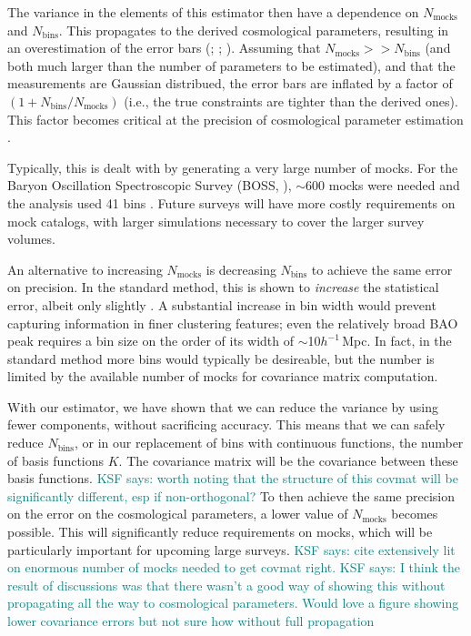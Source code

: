 \documentclass[modern]{aastex62}
\newcommand{\hmpc}{$h^{-1}\,$Mpc}
\newcommand{\NN}[1]{N_\mathrm{#1}}
\newcommand{\KSF}[1]{\textcolor{teal}{KSF says: #1}}
\begin{document}
The variance in the elements of this estimator then have a dependence on $\NN{mocks}$ and $\NN{bins}$.
This propagates to the derived cosmological parameters, resulting in an overestimation of the error bars (\citealt{Hartlap2007}; \citealt{Dodelson2013} \citealt{Percival2014}; \citealt{TaylorJoachimi2014}).
Assuming that $\NN{mocks} >> \NN{bins}$ (and both much larger than the number of parameters to be estimated), and that the measurements are Gaussian distribued, the error bars are inflated by a factor of $(1 + \NN{bins}/\NN{mocks})$ (i.e., the true constraints are tighter than the derived ones).
This factor becomes critical at the precision of cosmological parameter estimation \citep{Percival2014}.

Typically, this is dealt with by generating a very large number of mocks.
For the Baryon Oscillation Spectroscopic Survey (BOSS, \citealt{Dawson2013}), $\sim$600 mocks were needed and the analysis used 41 bins \citep{Sanchez2012}.
Future surveys will have more costly requirements on mock catalogs, with larger simulations necessary to cover the larger survey volumes.

An alternative to increasing $\NN{mocks}$ is decreasing $\NN{bins}$ to achieve the same error on precision.
In the standard method, this is shown to \emph{increase} the statistical error, albeit only slightly \cite{Percival2014}.
A substantial increase in bin width would prevent capturing information in finer clustering features; even the relatively broad BAO peak requires a bin size on the order of its width of $\sim$10\hmpc.
In fact, in the standard method more bins would typically be desireable, but the number is limited by the available number of mocks for covariance matrix computation.

With our estimator, we have shown that we can reduce the variance by using fewer components, without sacrificing accuracy.
This means that we can safely reduce $\NN{bins}$, or in our replacement of bins with continuous functions, the number of basis functions $K$.
The covariance matrix will be the covariance between these basis functions. \KSF{worth noting that the structure of this covmat will be significantly different, esp if non-orthogonal?}
To then achieve the same precision on the error on the cosmological parameters, a lower value of $\NN{mocks}$ becomes possible.
This will significantly reduce requirements on mocks, which will be particularly important for upcoming large surveys. 
\KSF{cite extensively lit on enormous number of mocks needed to get covmat right.}
\KSF{I think the result of discussions was that there wasn't a good way of showing this without propagating all the way to cosmological parameters. Would love a figure showing lower covariance errors but not sure how without full propagation}
\end{document}
